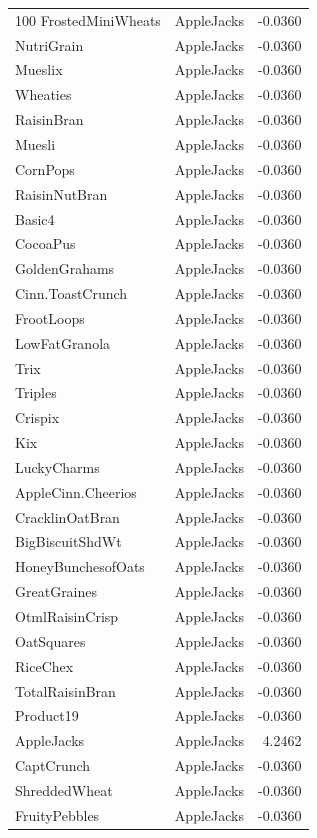 \begin{longtable}{llr}
100%
FrostedMiniWheats & AppleJacks & -0.0360 \\
NutriGrain & AppleJacks & -0.0360 \\
Mueslix & AppleJacks & -0.0360 \\
Wheaties & AppleJacks & -0.0360 \\
RaisinBran & AppleJacks & -0.0360 \\
Muesli & AppleJacks & -0.0360 \\
CornPops & AppleJacks & -0.0360 \\
RaisinNutBran & AppleJacks & -0.0360 \\
Basic4 & AppleJacks & -0.0360 \\
CocoaPus & AppleJacks & -0.0360 \\
GoldenGrahams & AppleJacks & -0.0360 \\
Cinn.ToastCrunch & AppleJacks & -0.0360 \\
FrootLoops & AppleJacks & -0.0360 \\
LowFatGranola & AppleJacks & -0.0360 \\
Trix & AppleJacks & -0.0360 \\
Triples & AppleJacks & -0.0360 \\
Crispix & AppleJacks & -0.0360 \\
Kix & AppleJacks & -0.0360 \\
LuckyCharms & AppleJacks & -0.0360 \\
AppleCinn.Cheerios & AppleJacks & -0.0360 \\
CracklinOatBran & AppleJacks & -0.0360 \\
BigBiscuitShdWt & AppleJacks & -0.0360 \\
HoneyBunchesofOats & AppleJacks & -0.0360 \\
GreatGraines & AppleJacks & -0.0360 \\
OtmlRaisinCrisp & AppleJacks & -0.0360 \\
OatSquares & AppleJacks & -0.0360 \\
RiceChex & AppleJacks & -0.0360 \\
TotalRaisinBran & AppleJacks & -0.0360 \\
Product19 & AppleJacks & -0.0360 \\
AppleJacks & AppleJacks & 4.2462 \\
CaptCrunch & AppleJacks & -0.0360 \\
ShreddedWheat & AppleJacks & -0.0360 \\
FruityPebbles & AppleJacks & -0.0360 \\

\end{longtable}
